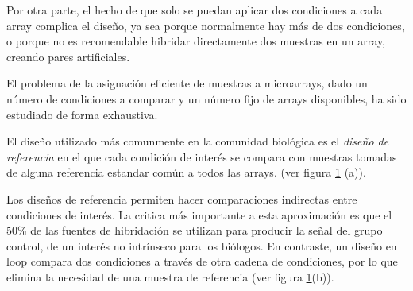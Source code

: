Por otra parte, el hecho de que solo se puedan aplicar dos condiciones a cada
array complica el dise\~no, ya sea porque normalmente hay m\'as de dos condiciones,
o porque no es recomendable hibridar directamente dos muestras en un array,
creando pares artificiales.

El problema de la asignaci\'on eficiente de muestras a microarrays, dado un n\'umero
de condiciones a comparar y un n\'umero fijo de arrays disponibles, ha sido
estudiado de forma exhaustiva.

El dise\~no utilizado m\'as comunmente en la comunidad biol\'ogica es el
 \emph{dise\~no de referencia} en el que cada condici\'on de inter\'es se compara
 con muestras tomadas de alguna referencia estandar com\'un a todos las arrays.
(ver figura \ref{c04referencevsloop} (a)).



\vspace{-0.5cm}
\begin{figure}[!h]
\label{c04referencevsloop}
\end{figure}

Los dise\~nos de referencia permiten hacer comparaciones indirectas entre
condiciones de inter\'es. La critica m\'as importante a esta aproximaci\'on es que el
50\% de las fuentes de hibridaci\'on se utilizan para  producir la se\~nal del grupo
control, de un inter\'es no intr\'inseco para los bi\'ologos.
En contraste, un dise\~no en loop compara dos condiciones a trav\'es de otra cadena
de condiciones, por lo que elimina la necesidad de una muestra de referencia
 (ver figura \ref{c04referencevsloop}(b)).



